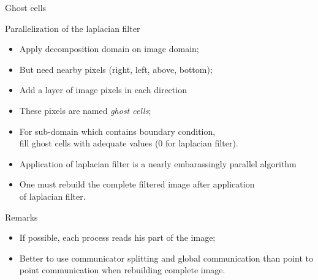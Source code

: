\documentclass[compress,10pt,aspectratio=169]{beamer}
\begin{document}
\begin{frame}[fragile]{Ghost cells}
  \scriptsize
  \begin{multicols}{2}
  \begin{block}{\small Parallelization of the laplacian filter}
    \begin{itemize}
    \item Apply decomposition domain on image domain;
    \item But need nearby pixels (right, left, above, bottom);
    \item Add a layer of image pixels in each direction
    \item These pixels are named \textsl{ghost cells};
    \item For sub-domain which contains boundary condition,\\
      fill ghost cells with adequate values (0 for laplacian filter).
    \item Application of laplacian filter is a nearly embarassingly parallel algorithm
    \item One must rebuild the complete filtered image after application \\ of laplacian filter.
    \end{itemize}
  \end{block}

  \begin{alertblock}{\small Remarks}
    \begin{itemize}
    \item \alert{If possible}, each process reads his part of the image;
    \item Better to use communicator splitting and global communication than point to point communication
      when rebuilding complete image.
    \end{itemize}
  \end{alertblock}
  
  \begin{center}
\end{center}
\end{multicols}
\end{frame}
\end{document}
